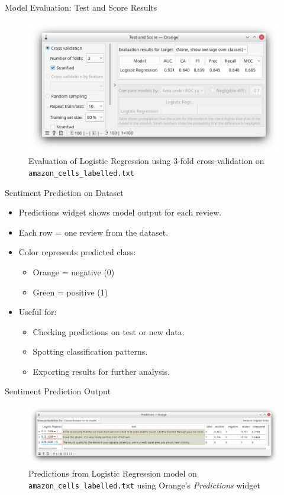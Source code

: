 \documentclass[aspectratio=169, table]{beamer}
\begin{document}
\begin{frame}{Model Evaluation: Test and Score Results}
	\vspace{20pt}
	\begin{figure}
		\centering
		\includegraphics[width=0.75\linewidth]{../../figures/sentiment_test.png}
		\caption{Evaluation of Logistic Regression using 3-fold cross-validation on \texttt{amazon\_cells\_labelled.txt}}
		\label{fig:sentiment-testscore}
	\end{figure}
\end{frame}

\begin{frame}{Sentiment Prediction on Dataset}
	\vspace{20pt}
	\begin{itemize}
		\item Predictions widget shows model output for each review.
		\item Each row = one review from the dataset.
		\item Color represents predicted class:
		\begin{itemize}
			\item Orange = negative (0)
			\item Green = positive (1)
		\end{itemize}
		\item Useful for:
		\begin{itemize}
			\item Checking predictions on test or new data.
			\item Spotting classification patterns.
			\item Exporting results for further analysis.
		\end{itemize}
	\end{itemize}
\end{frame}

\begin{frame}{Sentiment Prediction Output}
	\vspace{20pt}
	\begin{figure}
		\centering
		\includegraphics[width=\linewidth]{../../figures/sentiment_prediction.png}
		\caption{Predictions from Logistic Regression model on \texttt{amazon\_cells\_labelled.txt} using Orange's \textit{Predictions} widget}
		\label{fig:sentiment-predictions}
	\end{figure}
\end{frame}
\end{document}
